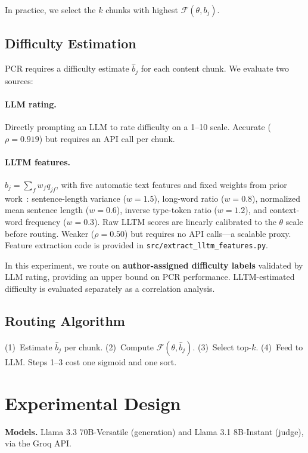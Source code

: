 \documentclass[11pt]{article}
\begin{document}
In practice, we select the $k$ chunks with highest $\mathcal{F}(\theta, b_j)$.

\subsection{Difficulty Estimation}

PCR requires a difficulty estimate $\hat{b}_j$ for each content chunk.
We evaluate two sources:

\paragraph{LLM rating.}
Directly prompting an LLM to rate difficulty on a 1--10 scale.
Accurate ($\rho = 0.919$) but requires an API call per chunk.

\paragraph{LLTM features.}
$\hat{b}_j = \sum_f w_f q_{jf}$, with five automatic text features and fixed weights from prior work~\citep{kang2026efsl}:
sentence-length variance ($w = 1.5$),
long-word ratio ($w = 0.8$),
normalized mean sentence length ($w = 0.6$),
inverse type-token ratio ($w = 1.2$),
and context-word frequency ($w = 0.3$).
Raw LLTM scores are linearly calibrated to the $\theta$ scale before routing.
Weaker ($\rho = 0.50$) but requires no API calls---a scalable proxy.
Feature extraction code is provided in \texttt{src/extract\_lltm\_features.py}.

In this experiment, we route on \textbf{author-assigned difficulty labels} validated by LLM rating, providing an upper bound on PCR performance.
LLTM-estimated difficulty is evaluated separately as a correlation analysis.

\subsection{Routing Algorithm}

(1)~Estimate $\hat{b}_j$ per chunk.
(2)~Compute $\mathcal{F}(\theta, \hat{b}_j)$.
(3)~Select top-$k$.
(4)~Feed to LLM.
Steps 1--3 cost one sigmoid and one sort.

\section{Experimental Design}

\textbf{Models.}
Llama 3.3 70B-Versatile (generation) and Llama 3.1 8B-Instant (judge), via the Groq API.
\end{document}
